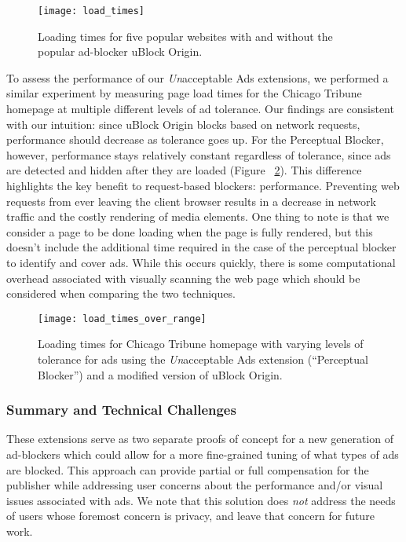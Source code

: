 \begin{figure}[h]
\centering
\texttt{[image: load\_times]}
\caption{Loading times for five popular websites with and without the popular ad-blocker uBlock Origin.}
\label{fig:load_times}
\end{figure}

To assess the performance of our \textit{Un}acceptable Ads extensions, we performed a similar experiment by measuring page load times for the Chicago Tribune homepage at multiple different levels of ad tolerance.
Our findings are consistent with our intuition: since uBlock Origin blocks based on network requests, performance should decrease as tolerance goes up.
For the Perceptual Blocker, however, performance stays relatively constant regardless of tolerance, since ads are detected and hidden after they are loaded (Figure ~\ref{fig:load_times_over_range}).
This difference highlights the key benefit to request-based blockers: performance.
Preventing web requests from ever leaving the client browser results in a decrease in network traffic and the costly rendering of media elements.
One thing to note is that we consider a page to be done loading when the page is fully rendered, but this doesn't include the additional time required in the case of the perceptual blocker to identify and cover ads.
While this occurs quickly, there is some computational overhead associated with visually scanning the web page which should be considered when comparing the two techniques.

\begin{figure}[h]
\centering
\texttt{[image: load\_times\_over\_range]}
\caption{Loading times for Chicago Tribune homepage with varying levels of tolerance for ads using the \textit{Un}acceptable Ads extension (``Perceptual Blocker'') and a modified version of uBlock Origin.}
\label{fig:load_times_over_range}
\end{figure}

\subsubsection{Summary and Technical Challenges}
These extensions serve as two separate proofs of concept for a new generation of ad-blockers which could allow for a more fine-grained tuning of what types of ads are blocked.
This approach can provide partial or full compensation for the publisher while addressing user concerns about the performance and/or visual issues associated with ads.
We note that this solution does \textit{not} address the needs of users whose foremost concern is privacy, and leave that concern for future work.


